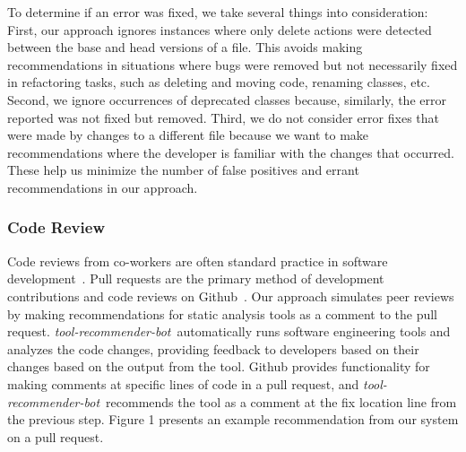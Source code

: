 \documentclass[sigconf,review,anonymous]{acmart}
\newcommand{\tool}{\textsl{tool-recommender-bot}}
\begin{document}
To determine if an error was fixed, we take several things into consideration: First, our approach ignores instances where only delete actions were detected between the base and head versions of a file. This avoids making recommendations in situations where bugs were removed but not necessarily fixed in refactoring tasks, such as deleting and moving code, renaming classes, etc. Second, we ignore occurrences of deprecated classes because, similarly, the error reported was not fixed but removed. Third, we do not consider error fixes that were made by changes to a different file because we want to make recommendations where the developer is familiar with the changes that occurred. These help us minimize the number of false positives and errant recommendations in our approach.


\subsubsection{Code Review}

Code reviews from co-workers are often standard practice in software development~\cite{CBirdCodeReviewingTrenches}. Pull requests are the primary method of development contributions and code reviews on Github~\cite{PullRequestReview}. Our approach simulates peer reviews by making recommendations for static analysis tools as a comment to the pull request. \tool~automatically runs software engineering tools and analyzes the code changes, providing feedback to developers based on their changes based on the output from the tool. Github provides functionality for making comments at specific lines of code in a pull request, and \tool~recommends the tool as a comment at the fix location line from the previous step. Figure 1 presents an example recommendation from our system on a pull request. %
\end{document}
